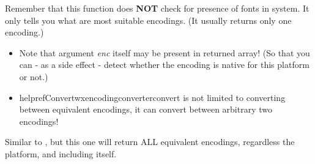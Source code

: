 Remember that this function does {\bf NOT} check for presence of
fonts in system. It only tells you what are most suitable
encodings. (It usually returns only one encoding.)


\begin{itemize}
\item Note that argument {\it enc} itself may be present in returned array!
(So that you can - as a side effect - detect whether the
encoding is native for this platform or not.)

\item helpref{Convert}{wxencodingconverterconvert} is not limited to 
converting between equivalent encodings, it can convert between arbitrary
two encodings!
\end{itemize}


\label{wxencodingconvertergetallequivalents}


Similar to 
, 
but this one will return ALL 
equivalent encodings, regardless the platform, and including itself.

